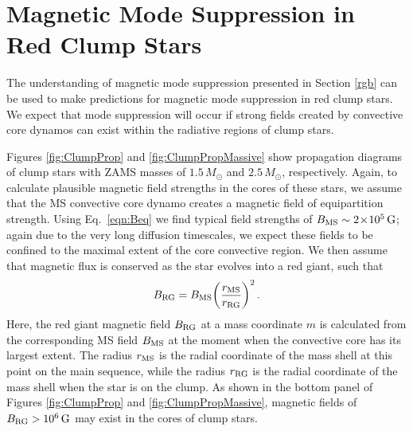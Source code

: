 \section{Magnetic Mode Suppression in Red Clump Stars}
\label{clump}

The understanding of magnetic mode suppression presented in Section \ref{rgb} can be used to make predictions for magnetic mode suppression in red clump stars. We expect that mode suppression will occur if strong fields created by convective core dynamos can exist within the radiative regions of clump stars. 


Figures \ref{fig:ClumpProp} and \ref{fig:ClumpPropMassive} show propagation diagrams of clump stars with ZAMS masses of $1.5 \, M_\odot$ and $2.5 \, M_\odot$, respectively. 
Again, to calculate plausible magnetic field strengths in the cores of these stars, we assume that the MS convective core dynamo creates a magnetic field of equipartition strength.
Using Eq.~\ref{eqn:Beq} we find typical field strengths of $B_{\rm MS} \sim 2 \! \times \! 10^5 \, {\rm G}$; again due to the very long diffusion timescales, we expect these fields to be confined to the maximal extent of the core convective region. We then assume that magnetic flux is conserved as the star evolves into a red giant, such that
\begin{equation}
\label{eqn:Brgb}
B_{\rm RG} = B_{\rm MS} \bigg( \frac{r_{\rm MS}}{r_{\rm RG}} \bigg)^2 \, .
\end{equation}
Here, the red giant magnetic field $B_{\rm RG}$ at a mass coordinate $m$ is calculated from the corresponding MS field $B_{\rm MS}$ at the moment when the convective core has its largest extent. The radius $r_{\rm MS}$ is the radial coordinate of the mass shell at this point on the main sequence, while the radius $r_{\rm RG}$ is the radial coordinate of the mass shell when the star is on the clump. As shown in the bottom panel of Figures \ref{fig:ClumpProp} and \ref{fig:ClumpPropMassive}, magnetic fields of $B_{\rm RG} > 10^6 \, {\rm G}$ may exist in the cores of clump stars. 

